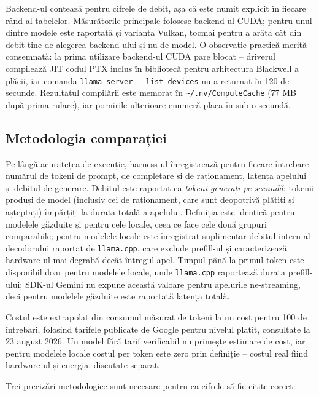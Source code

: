 \documentclass[12pt, a4paper]{report}
\newcommand{\code}[1]{\texttt{#1}}
\begin{document}
Backend-ul contează pentru cifrele de debit, așa că este numit explicit în
fiecare rând al tabelelor. Măsurătorile principale folosesc backend-ul CUDA;
pentru unul dintre modele este raportată și varianta Vulkan, tocmai pentru a
arăta cât din debit ține de alegerea backend-ului și nu de model. O observație
practică merită consemnată: la prima utilizare backend-ul CUDA pare blocat --
driverul compilează JIT codul PTX inclus în bibliotecă pentru arhitectura
Blackwell a plăcii, iar comanda \code{llama-server -{}-list-devices} nu a
returnat în 120 de secunde. Rezultatul compilării este memorat în
\code{\textasciitilde/.nv/ComputeCache} (77 MB după prima rulare), iar
pornirile ulterioare enumeră placa în sub o secundă.

\subsection{Metodologia comparației}

Pe lângă acuratețea de execuție, harness-ul înregistrează pentru fiecare
întrebare numărul de tokeni de prompt, de completare și de raționament, latența
apelului și debitul de generare. Debitul este raportat ca \emph{tokeni generați
pe secundă}: tokenii produși de model (inclusiv cei de raționament, care sunt
deopotrivă plătiți și așteptați) împărțiți la durata totală a apelului.
Definiția este identică pentru modelele găzduite și pentru cele locale, ceea ce
face cele două grupuri comparabile; pentru modelele locale este înregistrat
suplimentar debitul intern al decodorului raportat de \code{llama.cpp}, care
exclude prefill-ul și caracterizează hardware-ul mai degrabă decât întregul
apel. Timpul până la primul token este disponibil doar pentru modelele locale,
unde \code{llama.cpp} raportează durata prefill-ului; SDK-ul Gemini nu expune
această valoare pentru apelurile ne-streaming, deci pentru modelele găzduite
este raportată latența totală.

Costul este extrapolat din consumul măsurat de tokeni la un cost pentru 100 de
întrebări, folosind tarifele publicate de Google pentru nivelul plătit,
consultate la 23 august 2026. Un model fără tarif verificabil nu primește
estimare de cost, iar pentru modelele locale costul per token este zero prin
definiție -- costul real fiind hardware-ul și energia, discutate separat.

Trei precizări metodologice sunt necesare pentru ca cifrele să fie citite
corect:
\end{document}
